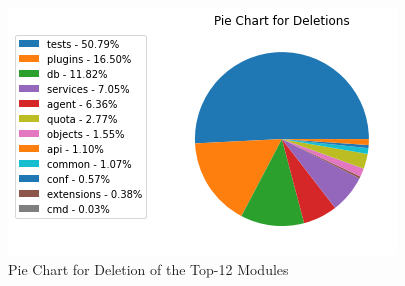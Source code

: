 \documentclass[11pt]{article}
\begin{document}
\begin{figure}[H]
    \centering
    \includegraphics[width=0.5\linewidth]{./img/deletion_pie.png}
    \caption{Pie Chart for Deletion of the Top-12 Modules}
    \label{fig:3}
\end{figure}
\end{document}
